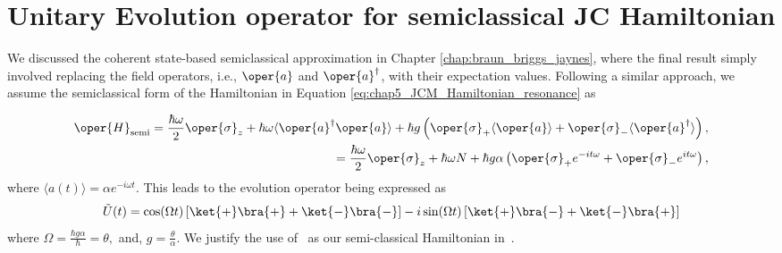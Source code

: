 \section{Unitary Evolution operator for semiclassical JC Hamiltonian}
We discussed the coherent state-based semiclassical approximation in Chapter 
\ref{chap:braun_briggs_jaynes}, where the final result simply involved replacing 
the field operators, i.e., \( \oper{a} \) and \( \oper{a}^\dagger \), with their 
expectation values. Following a similar approach, we assume the semiclassical form 
of the Hamiltonian in Equation \ref{eq:chap5_JCM_Hamiltonian_resonance} as

\begin{equation}
    \label{eq:chap5_JCM_Hamiltonian_semi}
    \begin{aligned}
        \oper{H}_{\text{semi}} = \frac{\hbar\omega}{2} \oper{\sigma}_z + \hbar \omega \langle \oper{a}^\dagger \oper{a} \rangle
    + \hbar g \left( \oper{\sigma}_+ \langle \oper{a} \rangle + \oper{\sigma}_- \langle \oper{a}^\dagger \rangle \right),\\
    = \frac{\hbar\omega}{2} \oper{\sigma}_z + \hbar \omega N 
    + \hbar g \alpha\left( \oper{\sigma}_+ e^{-it\omega} + \oper{\sigma}_- e^{it\omega} \right),
    \end{aligned}
\end{equation}
where \(\langle a(t) \rangle = \alpha e^{-i\omega t}\). This leads to the evolution operator being expressed as
\begin{equation}
        \begin{gathered}
                \tilde{U}(t) = 
        \cos(\Omega t) \left[ \ket{+}\bra{+} + \ket{-}\bra{-} \right] 
        - i \sin(\Omega t)
         \left[ \ket{+}\bra{-}
        + \ket{-}\bra{+} \right]
        \end{gathered}
\end{equation}
where \(\Omega = \frac{\hbar g\alpha}{\hbar} = \theta,\) and, \(g = \frac{\theta}{\alpha}\). We justify the 
use of~ as our semi-classical Hamiltonian in~. 

